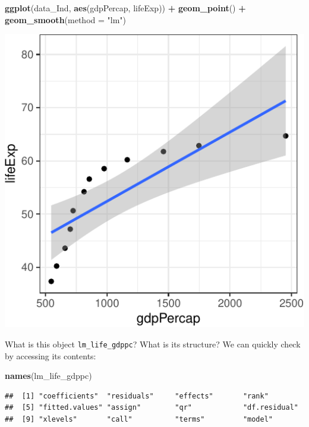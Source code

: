 \documentclass[12pt,]{article}
\newenvironment{Shaded}{\begin{snugshade}}{\end{snugshade}}
\newcommand{\KeywordTok}[1]{\textcolor[rgb]{0.13,0.29,0.53}{\textbf{#1}}}
\newcommand{\DataTypeTok}[1]{\textcolor[rgb]{0.13,0.29,0.53}{#1}}
\newcommand{\StringTok}[1]{\textcolor[rgb]{0.31,0.60,0.02}{#1}}
\newcommand{\OperatorTok}[1]{\textcolor[rgb]{0.81,0.36,0.00}{\textbf{#1}}}
\newcommand{\NormalTok}[1]{#1}
\begin{document}
\begin{Shaded}
\begin{Highlighting}[]
\KeywordTok{ggplot}\NormalTok{(data_Ind, }\KeywordTok{aes}\NormalTok{(gdpPercap, lifeExp)) }\OperatorTok{+}
\StringTok{  }\KeywordTok{geom_point}\NormalTok{() }\OperatorTok{+}
\StringTok{  }\KeywordTok{geom_smooth}\NormalTok{(}\DataTypeTok{method =} \StringTok{"lm"}\NormalTok{)}
\end{Highlighting}
\end{Shaded}

\begin{center}\includegraphics{Intro_tips_tricks_files/figure-latex/data_Ind_lm-1} \end{center}

What is this object \texttt{lm\_life\_gdppc}? What is its structure? We
can quickly check by accessing its contents:

\begin{Shaded}
\begin{Highlighting}[]
\KeywordTok{names}\NormalTok{(lm_life_gdppc)}
\end{Highlighting}
\end{Shaded}

\begin{verbatim}
##  [1] "coefficients"  "residuals"     "effects"       "rank"         
##  [5] "fitted.values" "assign"        "qr"            "df.residual"  
##  [9] "xlevels"       "call"          "terms"         "model"
\end{verbatim}
\end{document}
